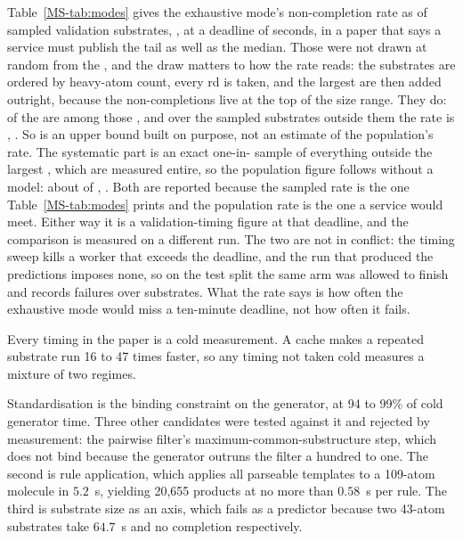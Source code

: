 \documentclass[journal=jcisd8,manuscript=suppinfo,layout=onecolumn]{achemso}
\begin{document}
Table~\ref{MS-tab:modes} gives the exhaustive mode's non-completion rate as \numCostUnfinished{} of
\numCostSampled{} sampled validation substrates, \numCostUnfinishedsharePct{}, at a deadline of
\numCostDeadline{} seconds, in a paper that says a service must publish the tail as well as the
median. Those \numCostSampled{} were not drawn at random from the \numCostPopulation{}, and the draw
matters to how the rate reads: the substrates are ordered by heavy-atom count, every
\numCostEvery{}rd is taken, and the largest \numCostTail{} are then added outright, because the
non-completions live at the top of the size range. They do:
\numCostTailunfinished{} of the \numCostUnfinished{} are among those \numCostTail{}, and over the
\numCostSystematic{} sampled substrates outside them the rate is \numCostSystematicunfinished{},
\numCostSystematicsharePct{}. So \numCostUnfinishedsharePct{} is an upper bound built on purpose,
not an estimate of the population's rate. The systematic part is an exact one-in-%
\numCostEvery{} sample of everything outside the largest \numCostTail{}, which are measured
entire, so the population figure follows without a model: about \numCostEstimated{} of
\numCostPopulation{}, \numCostEstimatedsharePct{}. Both are reported because the sampled rate is
the one Table~\ref{MS-tab:modes} prints and the population rate is the one a service would meet.
Either way it is a validation-timing figure at that deadline, and the comparison is measured on a
different run. The two are not in conflict: the timing sweep kills a worker that exceeds the
deadline, and the run that produced the predictions imposes none, so on the test split the same
arm was allowed to finish and records \numScoredFailed{} failures over \numScoredSubstrates{}
substrates. What the rate says is how often the exhaustive mode would miss a ten-minute deadline,
not how often it fails.

Every timing in the paper is a cold measurement. A cache makes a repeated substrate run 16 to 47
times faster, so any timing not taken cold measures a mixture of two regimes.

Standardisation is the binding constraint on the generator, at 94 to 99\% of cold generator time.
Three other candidates were tested against it and rejected by measurement: the pairwise filter's
maximum-common-substructure step, which does not bind because the generator outruns the filter a
hundred to one. The second is rule application, which applies all \numBankParses{} parseable
templates to a 109-atom molecule in $5.2$~s, yielding 20{,}655 products at no more than $0.58$~s
per rule. The third is substrate size as an axis, which fails as a predictor because two 43-atom
substrates take $64.7$~s and no completion respectively.
\end{document}

